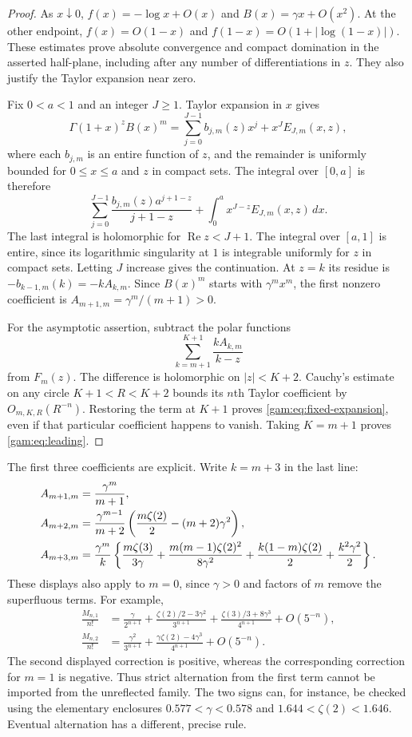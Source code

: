 \begin{proof}
As $x\downarrow0$, $f(x)=-\log x+O(x)$ and
$B(x)=\gamma x+O(x^2)$.  At the other endpoint,
$f(x)=O(1-x)$ and $f(1-x)=O(1+|\log(1-x)|)$.
These estimates prove absolute convergence and compact domination in
the asserted half-plane, including after any number of differentiations
in $z$.  They also justify the Taylor expansion near zero.

Fix $0<a<1$ and an integer $J\ge1$.  Taylor expansion in $x$ gives
\[
 \Gamma(1+x)^z B(x)^m
 =\sum_{j=0}^{J-1}b_{j,m}(z)x^j+x^J E_{J,m}(x,z),
\]
where each $b_{j,m}$ is an entire function of $z$, and the remainder is
uniformly bounded for $0\le x\le a$ and $z$ in compact sets.
The integral over $[0,a]$ is therefore
\[
 \sum_{j=0}^{J-1}\frac{b_{j,m}(z)a^{j+1-z}}{j+1-z}
 +\int_0^a x^{J-z}E_{J,m}(x,z)\,dx.
\]
The last integral is holomorphic for $\operatorname{Re}z<J+1$.
The integral over $[a,1]$ is entire, since its logarithmic singularity
at $1$ is integrable uniformly for $z$ in compact sets.  Letting $J$
increase gives the continuation.  At $z=k$ its residue is
$-b_{k-1,m}(k)=-kA_{k,m}$.  Since $B(x)^m$ starts with
$\gamma^m x^m$, the first nonzero coefficient is
$A_{m+1,m}=\gamma^m/(m+1)>0$.

For the asymptotic assertion, subtract the polar functions
\[
 \sum_{k=m+1}^{K+1}\frac{kA_{k,m}}{k-z}
\]
from $F_m(z)$.  The difference is holomorphic on $|z|<K+2$.
Cauchy's estimate on any circle $K+1<R<K+2$ bounds its $n$th Taylor
coefficient by $O_{m,K,R}(R^{-n})$.  Restoring the term at $K+1$
proves \eqref{gam:eq:fixed-expansion}, even if that particular coefficient
happens to vanish.  Taking $K=m+1$ proves \eqref{gam:eq:leading}.
\end{proof}

The first three coefficients are explicit.  Write $k=m+3$ in the last line:
\begin{align}
 A_{m+1,m}&=\frac{\gamma^m}{m+1},\label{gam:eq:first-three}\\
 A_{m+2,m}&=\frac{\gamma^{m-1}}{m+2}
 \left(\frac{m\zeta(2)}2-(m+2)\gamma^2\right),\notag\\
 A_{m+3,m}&=\frac{\gamma^m}{k}
 \left\{\frac{m\zeta(3)}{3\gamma}
 +\frac{m(m-1)\zeta(2)^2}{8\gamma^2}
 +\frac{k(1-m)\zeta(2)}2+\frac{k^2\gamma^2}2\right\}.\notag
\end{align}
These displays also apply to $m=0$, since $\gamma>0$ and factors of
$m$ remove the superfluous terms.  For example,
\begin{align*}
 \frac{M_{n,1}}{n!}
 &=\frac{\gamma}{2^{n+1}}
 +\frac{\zeta(2)/2-3\gamma^2}{3^{n+1}}
 +\frac{\zeta(3)/3+8\gamma^3}{4^{n+1}}+O(5^{-n}),\\
 \frac{M_{n,2}}{n!}
 &=\frac{\gamma^2}{3^{n+1}}
 +\frac{\gamma\zeta(2)-4\gamma^3}{4^{n+1}}+O(5^{-n}).
\end{align*}
The second displayed correction is positive, whereas the corresponding
correction for $m=1$ is negative.  Thus strict alternation from the first
term cannot be imported from the unreflected family.  The two signs can,
for instance, be checked using the elementary enclosures
$0.577<\gamma<0.578$ and $1.644<\zeta(2)<1.646$.
Eventual alternation has a different, precise rule.

